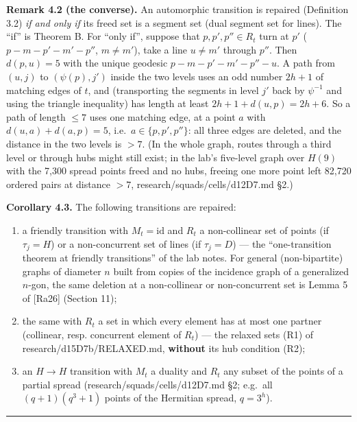 \documentclass[
  11pt,
]{article}
\providecommand{\tightlist}{%
  \setlength{\itemsep}{0pt}\setlength{\parskip}{0pt}}
\begin{document}
\textbf{Remark 4.2 (the converse).} An automorphic transition is repaired (Definition 3.2) \emph{if and only if} its
freed set is a segment set (dual segment set for lines). The ``if'' is Theorem B. For ``only if'', suppose that
\(p, p', p''\in R_t\) turn at \(p'\) (\(p - m - p' - m' - p''\), \(m\ne m'\)), take a line \(u\ne m'\) through \(p''\).
Then \(d(p,u) = 5\) with the unique geodesic \(p - m - p' - m' - p'' - u\). A path from \((u,j)\) to \((\psi(p),j')\)
inside the two levels uses an odd number \(2h+1\) of matching edges of \(t\), and (transporting the segments in level
\(j'\) back by \(\psi^{-1}\) and using the triangle inequality) has length at least \(2h+1+d(u,p) = 2h+6\). So a path of
length \(\le 7\) uses one matching edge, at a point \(a\) with \(d(u,a)+d(a,p) = 5\), i.e.~\(a\in\{p, p', p''\}\): all
three edges are deleted, and the distance in the two levels is \(> 7\). (In the whole graph, routes through a third
level or through hubs might still exist; in the lab's five-level graph over \(H(9)\) with the 7,300 spread points freed
and no hubs, freeing one more point left 82,720 ordered pairs at distance \(> 7\), research/squads/cells/d12D7.md §2.)

\textbf{Corollary 4.3.} The following transitions are repaired:

\begin{enumerate}
\def\labelenumi{\arabic{enumi}.}
\tightlist
\item
  a friendly transition with \(M_t = \mathrm{id}\) and \(R_t\) a non-collinear set of points (if \(\tau_j = H\)) or a
  non-concurrent set of lines (if \(\tau_j = D\)) --- the ``one-transition theorem at friendly transitions'' of the lab
  notes. For general (non-bipartite) graphs of diameter \(n\) built from copies of the incidence graph of a generalized
  \(n\)-gon, the same deletion at a non-collinear or non-concurrent set is Lemma 5 of {[}Ra26{]} (Section 11);
\item
  the same with \(R_t\) a set in which every element has at most one partner (collinear, resp. concurrent element of
  \(R_t\)) --- the relaxed sets (R1) of research/d15D7b/RELAXED.md, \textbf{without} its hub condition (R2);
\item
  an \(H\to H\) transition with \(M_t\) a duality and \(R_t\) any subset of the points of a partial spread
  (research/squads/cells/d12D7.md §2; e.g.~all \((q+1)(q^3+1)\) points of the Hermitian spread, \(q=3^h\)).
\end{enumerate}

\begin{center}\rule{0.5\linewidth}{0.5pt}\end{center}
\end{document}
